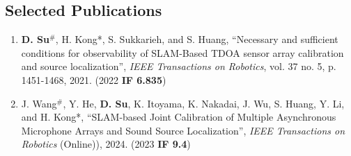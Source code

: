 \documentclass[margin,line]{res}
\begin{document}
\begin{resume}
\section{\sc Selected Publications}
%
%

\begin{enumerate}

\item \textbf{D. Su}$^{\#}$, H. Kong*, S. Sukkarieh, and S. Huang, ``Necessary and sufficient conditions for observability of SLAM-Based TDOA sensor array calibration and source localization'', {\it IEEE Transactions on Robotics}, vol. 37 no. 5, p. 1451-1468, 2021. (2022 \textbf{IF 6.835})

\item J. Wang$^{\#}$, Y. He, \textbf{D. Su}, K. Itoyama, K. Nakadai, J. Wu, S. Huang, Y. Li, and H. Kong*, ``SLAM-based Joint Calibration of Multiple Asynchronous Microphone Arrays and Sound Source Localization'', {\it IEEE Transactions on Robotics} (Online)), 2024. (2023 \textbf{IF 9.4})



\end{enumerate}
\end{resume}
\end{document}
